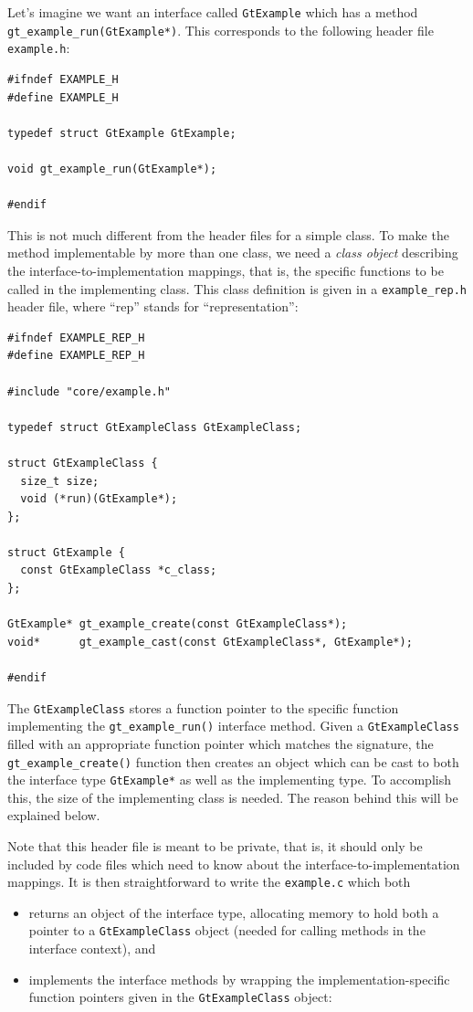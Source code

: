 \documentclass[11pt,final]{article}
\newcommand{\keyword}[1]{\lstinline{#1}}
\begin{document}
Let's imagine we want an interface called \keyword{GtExample} which has a
method \keyword{gt_example_run(GtExample*)}. This corresponds to the following
header file \keyword{example.h}:

\begin{lstlisting}
#ifndef EXAMPLE_H
#define EXAMPLE_H

typedef struct GtExample GtExample;

void gt_example_run(GtExample*);

#endif
\end{lstlisting}

This is not much different from the header files for a simple class. To make
the method implementable by more than one class, we need a \emph{class object}
describing the interface-to-implementation mappings, that is, the specific
functions to be called in the implementing class. This class definition is given
in a \keyword{example_rep.h} header file, where ``rep'' stands for
``representation'':

\begin{lstlisting}
#ifndef EXAMPLE_REP_H
#define EXAMPLE_REP_H

#include "core/example.h"

typedef struct GtExampleClass GtExampleClass;

struct GtExampleClass {
  size_t size;
  void (*run)(GtExample*);
};

struct GtExample {
  const GtExampleClass *c_class;
};

GtExample* gt_example_create(const GtExampleClass*);
void*      gt_example_cast(const GtExampleClass*, GtExample*);

#endif
\end{lstlisting}

The \keyword{GtExampleClass} stores a function pointer to the specific function
implementing the \keyword{gt_example_run()} interface method. Given a
\keyword{GtExampleClass} filled with an appropriate function pointer which
matches the signature, the \keyword{gt_example_create()} function then creates
an object which can be cast to both the interface type \keyword{GtExample*} as
well as the implementing type. To accomplish this, the size of the
implementing class is needed. The reason behind this will be explained below.

Note that this header file is meant to be private, that is, it should only be
included by code files which need to know about the interface-to-implementation
mappings. It is then straightforward to write the \keyword{example.c} which both
\begin{itemize}
\item
returns an object of the interface type, allocating memory to hold both a
pointer to a \keyword{GtExampleClass} object (needed for calling methods in the
interface context), and
\item
implements the interface methods by wrapping the implementation-specific
function pointers given in the \keyword{GtExampleClass} object:
\end{itemize}
\end{document}
